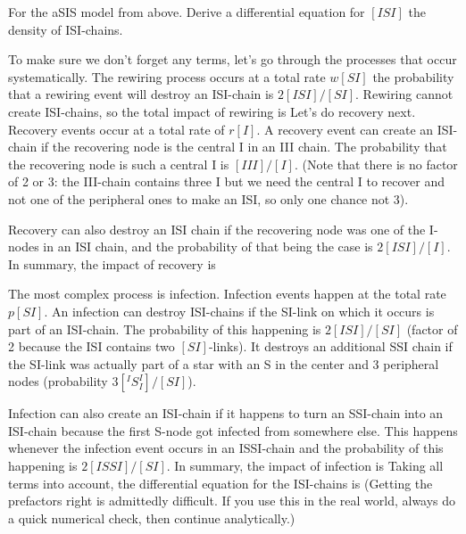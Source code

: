 For the aSIS model from above. Derive a differential equation for $[ISI]$ the density of ISI-chains. 

\solution
To make sure we don't forget any terms, let's go through the processes that occur systematically. The rewiring process occurs at a total rate $w[SI]$ the probability that a rewiring event will destroy an ISI-chain is $2[ISI]/[SI]$. Rewiring cannot create ISI-chains, so the total impact of rewiring is 
Let's do recovery next. Recovery events occur at a total rate of $r[I]$. A recovery event can create an ISI-chain if the recovering node is the central I in an III chain. The probability that the recovering node is such a central I is $[III]/[I]$. (Note that there is no factor of 2 or 3: the III-chain contains three I but we need the central I to recover and not one of the peripheral ones to make an ISI, so only one chance not 3). 

Recovery can also destroy an ISI chain if the recovering node was one of the I-nodes in an ISI chain, and the probability of that being the case is $2[ISI]/[I]$. In summary, the impact of recovery is 

The most complex process is infection. Infection events happen at the total rate $p[SI]$. An infection can destroy ISI-chains if the SI-link on which it occurs is part of an ISI-chain. The probability of this happening is $2[ISI]/[SI]$ (factor of 2 because the ISI contains two $[SI]$-links). It destroys an additional SSI chain if the SI-link was actually part of a star with an S in the center and 3 peripheral nodes (probability $3[^IS_I^I]/[SI]$). 

Infection can also create an ISI-chain if it happens to turn an SSI-chain into an ISI-chain because the first S-node got infected from somewhere else. This happens whenever the infection event occurs in an ISSI-chain and the probability of this happening is $2[ISSI]/[SI]$.
In summary, the impact of infection is 
Taking all terms into account, the differential equation for the ISI-chains is 
(Getting the prefactors right is admittedly difficult. If you use this in the real world, always do a quick numerical check, then continue analytically.)